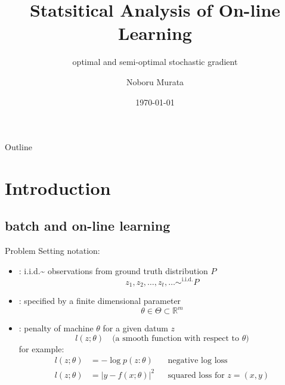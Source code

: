 \documentclass[fleqn,aspectratio=1610]{beamer}
\author{Noboru Murata}
\date{\today}
\title{Statsitical Analysis of On-line Learning}
\subtitle{optimal and semi-optimal stochastic gradient}
\institute{\url{https://noboru-murata.github.io/}}
\begin{document}
\maketitle
\begin{frame}{Outline}
\tableofcontents
\end{frame}


\section{Introduction}
\label{sec:org35ac57c}
\subsection{batch and on-line learning}
\label{sec:org29793be}
\begin{frame}[label={sec:org31d68da}]{Problem Setting}
notation:
\begin{itemize}
\item {}: 
i.i.d.\textasciitilde{} observations from ground truth distribution \(P\)
\begin{equation}
  z_{1},z_{2},\dotsc,z_{t},\dotsc \sim^{\mathrm{i.i.d.}} P 
\end{equation}
\item {}: 
specified by a finite dimensional parameter
\begin{equation}
  \theta \in \Theta\subset \mathbb{R}^{m}
\end{equation}
\item {}: 
penalty of machine \(\theta\) for a given datum \(z\) 
\begin{equation}
  l(z;\theta)
  \quad\text{(a smooth function with respect to \(\theta\))}
\end{equation}
for example:
\begin{align}
  l(z;\theta)&=-\log p(z:\theta)
  &&\text{negative log loss}\\[-2pt]
  l(z;\theta)&=|y-f(x;\theta)|^{2}
  &&\text{squared loss for \(z=(x,y)\)}
\end{align}
\end{itemize}
\end{frame}
\end{document}

